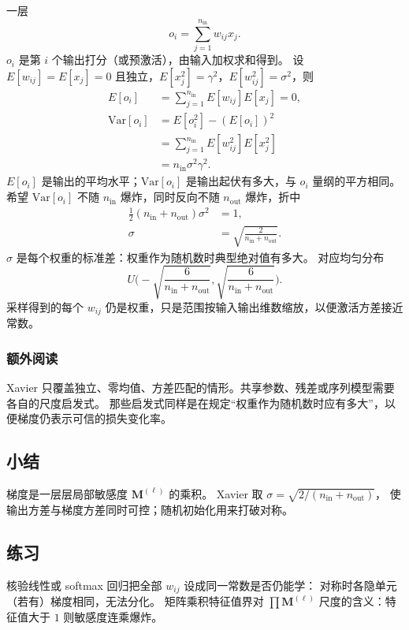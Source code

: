 一层
\[
o_{i}=\sum_{j=1}^{n_{\mathrm{in}}}w_{ij}x_{j}.
\]
$o_i$ 是第 $i$ 个输出打分（或预激活），由输入加权求和得到。
设 $E[w_{ij}]=E[x_{j}]=0$ 且独立，$E[x_{j}^{2}]=\gamma^{2}$，$E[w_{ij}^{2}]=\sigma^{2}$，则
\begin{align*}
E[o_{i}]
&=
\sum_{j=1}^{n_{\mathrm{in}}}E[w_{ij}]E[x_{j}]=0,\\
\mathrm{Var}[o_{i}]
&=
E[o_{i}^{2}]-(E[o_{i}])^{2}\\
&=
\sum_{j=1}^{n_{\mathrm{in}}}E[w_{ij}^{2}]E[x_{j}^{2}]\\
&=
n_{\mathrm{in}}\sigma^{2}\gamma^{2}.
\end{align*}
$E[o_i]$ 是输出的平均水平；$\mathrm{Var}[o_i]$ 是输出起伏有多大，与 $o_i$ 量纲的平方相同。
希望 $\mathrm{Var}[o_{i}]$ 不随 $n_{\mathrm{in}}$ 爆炸，同时反向不随 $n_{\mathrm{out}}$ 爆炸，折中
\begin{align*}
\frac{1}{2}(n_{\mathrm{in}}+n_{\mathrm{out}})\sigma^{2}&=1,\\
\sigma&=\sqrt{\frac{2}{n_{\mathrm{in}}+n_{\mathrm{out}}}}.
\end{align*}
$\sigma$ 是每个权重的标准差：权重作为随机数时典型绝对值有多大。
对应均匀分布
\[
U\Biggl(
-\sqrt{\frac{6}{n_{\mathrm{in}}+n_{\mathrm{out}}}},
\sqrt{\frac{6}{n_{\mathrm{in}}+n_{\mathrm{out}}}}
\Biggr).
\]
采样得到的每个 $w_{ij}$ 仍是权重，只是范围按输入输出维数缩放，以便激活方差接近常数。

\subsubsection{额外阅读}

Xavier 只覆盖独立、零均值、方差匹配的情形。共享参数、残差或序列模型需要各自的尺度启发式。
那些启发式同样是在规定“权重作为随机数时应有多大”，以便梯度仍表示可信的损失变化率。

\subsection{小结}

梯度是一层层局部敏感度 $\bm{M}^{(\ell)}$ 的乘积。
Xavier 取 $\sigma=\sqrt{2/(n_{\mathrm{in}}+n_{\mathrm{out}})}$，
使输出方差与梯度方差同时可控；随机初始化用来打破对称。

\subsection{练习}

核验线性或 softmax 回归把全部 $w_{ij}$ 设成同一常数是否仍能学：
对称时各隐单元（若有）梯度相同，无法分化。
矩阵乘积特征值界对 $\prod\bm{M}^{(\ell)}$ 尺度的含义：特征值大于 $1$ 则敏感度连乘爆炸。

